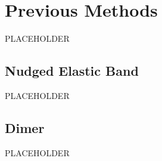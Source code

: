 \section{Previous Methods}
PLACEHOLDER
\subsection{Nudged Elastic Band}
PLACEHOLDER
\subsection{Dimer}
PLACEHOLDER
